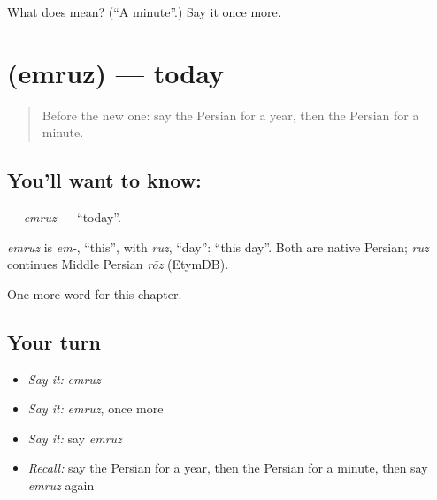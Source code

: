 \begin{tcolorbox}[breakable,colback=teal!4,colframe=teal!35!black,title={Before you move on}]
What does  mean? (\textquotedblleft{}A minute\textquotedblright{}.) Say it once more.
\end{tcolorbox}
\section[\texorpdfstring{\fa{امروز} (emruz)}{امروز (emruz)}]{ (emruz) — today}

\label{lesson:FA-C65-emruz}



\begin{quote}
Before the new one: say the Persian for a year, then the Persian for a minute.
\end{quote}

\subsection*{You'll want to know: }
\textbf{} — \emph{emruz} — \textquotedblleft{}today\textquotedblright{}.

\begin{cousinweb}
\emph{emruz} is \emph{em-}, \textquotedblleft{}this\textquotedblright{}, with \emph{ruz}, \textquotedblleft{}day\textquotedblright{}: \textquotedblleft{}this day\textquotedblright{}. Both are native Persian; \emph{ruz} continues Middle Persian \emph{rōz} (EtymDB).
\end{cousinweb}

\begin{grammarlens}[title={What you've built}]
One more word for this chapter.
\end{grammarlens}

\subsection*{Your turn}
\begin{itemize}
\raggedright
  \item \emph{Say it:} \emph{emruz}
  \item \emph{Say it:} \emph{emruz}, once more
  \item \emph{Say it:} say \emph{emruz}
  \item \emph{Recall:} say the Persian for a year, then the Persian for a minute, then say \emph{emruz} again
\end{itemize}

